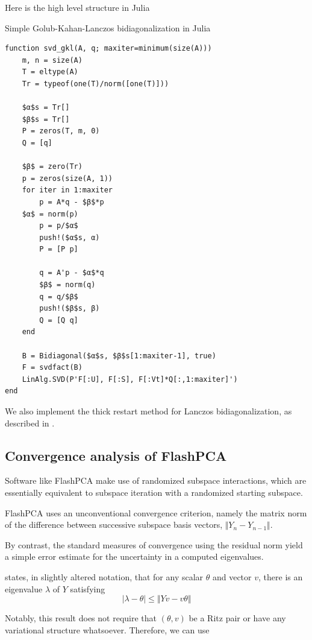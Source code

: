 \documentclass[review]{siamart0516}
\begin{document}
Here is the high level structure in Julia

\begin{algorithm}
\caption{Simple Golub-Kahan-Lanczos bidiagonalization in Julia}

\begin{lstlisting}
function svd_gkl(A, q; maxiter=minimum(size(A)))
    m, n = size(A)
    T = eltype(A)
    Tr = typeof(one(T)/norm([one(T)]))

    $α$s = Tr[]
    $β$s = Tr[]
    P = zeros(T, m, 0)
    Q = [q]

    $β$ = zero(Tr)
    p = zeros(size(A, 1))
    for iter in 1:maxiter
        p = A*q - $β$*p
	$α$ = norm(p)
        p = p/$α$
        push!($α$s, α)
        P = [P p]

        q = A'p - $α$*q
        $β$ = norm(q)
        q = q/$β$
        push!($β$s, β)
        Q = [Q q]
    end

    B = Bidiagonal($α$s, $β$s[1:maxiter-1], true)
    F = svdfact(B)
    LinAlg.SVD(P'F[:U], F[:S], F[:Vt]*Q[:,1:maxiter]')
end
\end{lstlisting}
\end{algorithm}


We also implement the thick restart method for Lanczos bidiagonalization, as described in \cite{Baglama2005}.


\subsection{Convergence analysis of FlashPCA}

Software like FlashPCA make use of randomized subspace interactions, which are
essentially equivalent to subspace iteration with a randomized starting subspace.

FlashPCA uses an unconventional convergence criterion, namely the matrix norm
of the difference between successive subspace basis vectors,
$\Vert Y_n - Y_{n-1} \Vert$.

By contrast, the standard measures of convergence using the residual norm yield
a simple error estimate for the uncertainty in a computed eigenvalues.

\cite[Theorem 4.5.1]{Parlett1998} states, in slightly altered notation, that for
any scalar $\theta$ and vector $v$, there is an eigenvalue $\lambda$ of $Y$ satisfying
\[
\vert\lambda - \theta\vert \le \Vert Y v - v \theta \Vert
\]

Notably, this result does not require that $(\theta, v)$ be a Ritz pair or have
any variational structure whatsoever. Therefore, we can use
\end{document}
